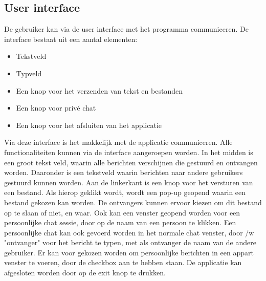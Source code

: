 \documentclass{article}
\begin{document}
\subsection{User interface}
De gebruiker kan via de user interface met het programma communiceren. De interface bestaat uit een aantal elementen:
\begin{itemize}
\item Tekstveld
\item Typveld
\item Een knop voor het verzenden van tekst en bestanden
\item Een knop voor priv\'{e} chat
\item Een knop voor het afsluiten van het applicatie
\end{itemize}

Via deze interface is het makkelijk met de applicatie communiceren. Alle functionaliteiten kunnen via de interface aangeroepen worden. In het midden is een groot tekst veld, waarin alle berichten verschijnen die gestuurd en ontvangen worden. Daaronder is een tekstveld waarin berichten naar andere gebruikers gestuurd kunnen worden. Aan de linkerkant is een knop voor het versturen van een bestand. Als hierop geklikt wordt, wordt een pop-up geopend waarin een bestand gekozen kan worden. De ontvangers kunnen ervoor kiezen om dit bestand op te slaan of niet, en waar. Ook kan een venster geopend worden voor een persoonlijke chat sessie, door op de naam van een persoon te klikken. Een persoonlijke chat kan ook gevoerd worden in het normale chat venster, door /w "ontvanger" voor het bericht te typen, met als ontvanger de naam van de andere gebruiker.  Er kan voor gekozen worden om persoonlijke berichten in een appart venster te voeren, door de checkbox aan te hebben staan. De applicatie kan afgesloten worden door op de exit knop te drukken.
\end{document}
